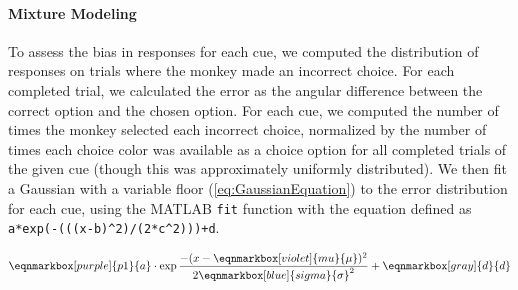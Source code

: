 
\paragraph{Mixture Modeling}\label{para:MixtureModeling}

To assess the bias in responses for each cue, we computed the distribution of responses on trials where the monkey made an incorrect choice.
For each completed trial, we calculated the error as the angular difference between the correct option and the chosen option.  
For each cue, we computed the number of times the monkey selected each incorrect choice, normalized by the number of times each choice color was available as a choice option for all completed trials of the given cue (though this was approximately uniformly distributed).
We then fit a Gaussian with a variable floor (\autoref{eq:GaussianEquation}) to the error distribution for each cue, using the MATLAB \lstinline{fit} function with the equation defined as \lstinline{a*exp(-(((x-b)^2)/(2*c^2)))+d}. 



\vspace{2em} 
\begin{equation} \label{eq:GaussianEquation}
    \eqnmarkbox[purple]{p1}{a}
    \cdot
    \exp
    \frac{-(x-
    \eqnmarkbox[violet]{mu}{\mu}
    )^2}{2 
    \eqnmarkbox[blue]{sigma}{\sigma}^2}
    +
    \eqnmarkbox[gray]{d}{d}        
\end{equation}

\vspace{2em} 

